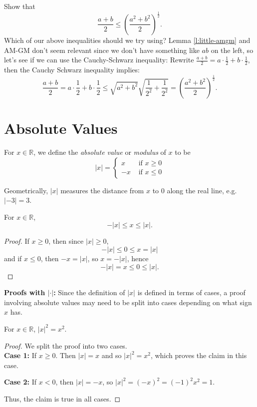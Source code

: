 \documentclass[11pt,dvipsnames]{book}
\numberwithin{figure}{section} %
\numberwithin{table}{section} %
\begin{document}
\begin{example} Show that
\[
\frac{a+b}{2} \leq \left(\frac{a^2+b^2}{2}\right)^{\frac{1}{2}}.
\]
Which of our above inequalities should we try using? Lemma \ref{l:little-amgm} and AM-GM don't seem relevant since we don't have something like $ab$ on the left, so let's see if we can use the Cauchy-Schwarz inequality: Rewrite $\frac{a+b}{2}=a\cdot \frac{1}{2} +b\cdot\frac{1}{2}$, then the Cauchy Schwarz inequality implies:
\[
\frac{a+b}{2} = a\cdot\frac{1}{2} + b\cdot\frac{1}{2} \leq \sqrt{a^2+b^2}\sqrt{\frac{1}{2^{2}}+\frac{1}{2^{2}}}
=\left(\frac{a^2+b^2}{2}\right)^{\frac{1}{2}}.
\]
\end{example}
\section{Absolute Values}%
\label{absolutevalues}

\begin{definition}
For $x\in \mathbb{R}$, we define the {\it absolute value} or {\it modulus} of $x$ to be
\[
|x| = \left\{\begin{array}{ll} x & \mbox{ if } x\geq 0 \\ -x & \mbox{ if } x\leq 0 \end{array}\right.
\]
\end{definition}

Geometrically, $|x|$ measures the distance from $x$ to $0$ along the real line, e.g. $|-3|=3$.

\begin{lemma}
For $x\in\mathbb{R}$,
\[
-|x|\leq x\leq |x|.
\]
\end{lemma}
\begin{proof}
If $x\geq 0$, then since $|x|\geq 0$,
\[
-|x|\leq 0\leq x=|x|
\]
and if $x\leq 0$, then $-x=|x|$, so $x=-|x|$, hence
\[
-|x|=x\leq 0\leq |x|.
\]
\end{proof}

\begin{protip}
{\bf Proofs with $|\cdot|$:} Since the definition of $|x|$ is defined in terms of cases, a proof involving absolute values may need to be split into cases depending on what sign $x$ has.
\end{protip}

\begin{example}
\label{ex:|x|^2=x^2}
For $x\in \mathbb{R}$, $|x|^2=x^2$.

\begin{proof}
We split the proof into two cases. \\

{\bf Case 1:} If $x\geq 0$. Then $|x|=x$ and so $|x|^2=x^2$, which proves the claim in this case.

{\bf Case 2:} If $x<0$, then $|x|=-x$, so $|x|^2=(-x)^2=(-1)^2x^2=1$.

 Thus, the claim is true in all cases.

\end{proof}
\end{example}
\end{document}

